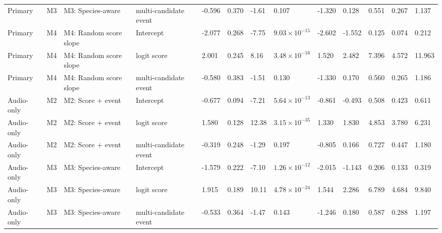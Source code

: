 \begin{landscape}
\begin{longtable}{L{1.5cm}L{1.0cm}L{2.6cm}L{2.4cm}*{9}{C{1.05cm}}}
Primary & M3 & M3: Species-aware & multi-candidate event & -0.596 & 0.370 & -1.61 & 0.107 & -1.320 & 0.128 & 0.551 & 0.267 & 1.137 \\
Primary & M4 & M4: Random score slope & Intercept & -2.077 & 0.268 & -7.75 & $9.03\times 10^{-15}$ & -2.602 & -1.552 & 0.125 & 0.074 & 0.212 \\
Primary & M4 & M4: Random score slope & logit score & 2.001 & 0.245 & 8.16 & $3.48\times 10^{-16}$ & 1.520 & 2.482 & 7.396 & 4.572 & 11.963 \\
Primary & M4 & M4: Random score slope & multi-candidate event & -0.580 & 0.383 & -1.51 & 0.130 & -1.330 & 0.170 & 0.560 & 0.265 & 1.186 \\
Audio-only & M2 & M2: Score + event & Intercept & -0.677 & 0.094 & -7.21 & $5.64\times 10^{-13}$ & -0.861 & -0.493 & 0.508 & 0.423 & 0.611 \\
Audio-only & M2 & M2: Score + event & logit score & 1.580 & 0.128 & 12.38 & $3.15\times 10^{-35}$ & 1.330 & 1.830 & 4.853 & 3.780 & 6.231 \\
Audio-only & M2 & M2: Score + event & multi-candidate event & -0.319 & 0.248 & -1.29 & 0.197 & -0.805 & 0.166 & 0.727 & 0.447 & 1.180 \\
Audio-only & M3 & M3: Species-aware & Intercept & -1.579 & 0.222 & -7.10 & $1.26\times 10^{-12}$ & -2.015 & -1.143 & 0.206 & 0.133 & 0.319 \\
Audio-only & M3 & M3: Species-aware & logit score & 1.915 & 0.189 & 10.11 & $4.78\times 10^{-24}$ & 1.544 & 2.286 & 6.789 & 4.684 & 9.840 \\
Audio-only & M3 & M3: Species-aware & multi-candidate event & -0.533 & 0.364 & -1.47 & 0.143 & -1.246 & 0.180 & 0.587 & 0.288 & 1.197 \\
\end{longtable}
\end{landscape}

